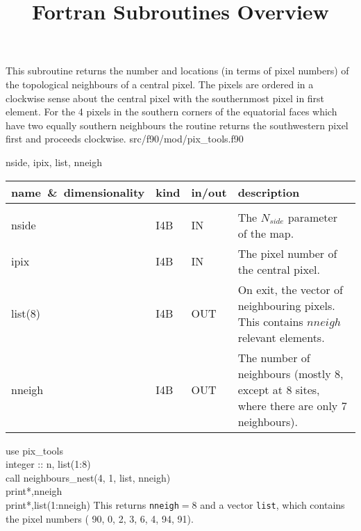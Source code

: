 
\sloppy

\title{\healpix Fortran Subroutines Overview}
 \section[neighbours\_nest]{ }
\label{sub:neighbours_nest}
\author{}

\begin{facility}
{This subroutine returns the number and locations (in terms of pixel
numbers) of the topological neighbours of a central pixel. The pixels
are ordered in a clockwise sense about the central pixel with the
southernmost pixel in first element. For the 4 pixels in the southern corners of the
equatorial faces which have two equally southern neighbours the
routine returns the southwestern pixel first and proceeds clockwise.}
{src/f90/mod/pix\_tools.f90}
\end{facility}

\begin{f90format}
{nside, ipix, list, nneigh}
\end{f90format}

\begin{arguments}
{
\begin{tabular}{p{0.4\hsize} p{0.05\hsize} p{0.1\hsize} p{0.35\hsize}} \hline  
\textbf{name~\&~dimensionality} & \textbf{kind} & \textbf{in/out} & \textbf{description} \\ \hline
                   &   &   &                           \\ %
nside & I4B & IN & The $N_{side}$ parameter of the map. \\
ipix & I4B & IN & The pixel number of the central pixel. \\
list(8) & I4B & OUT & On exit, the vector of neighbouring pixels. This
                   contains $nneigh$ relevant elements.\\
nneigh & I4B & OUT & The number of neighbours (mostly 8, except at
                   8 sites, where there are only 7 neighbours).\\
\end{tabular}
}
\end{arguments}

\begin{example}
{
use pix\_tools \\
integer :: n, list(1:8) \\
call neighbours\_nest(4, 1, list, nneigh)  \\
print*,nneigh \\
print*,list(1:nneigh)
}
{
This returns {\tt nneigh}$=8$ and a vector {\tt list}, which contains the pixel
numbers ( 90,  0,  2,  3,  6,  4,  94,  91).}
\end{example}

